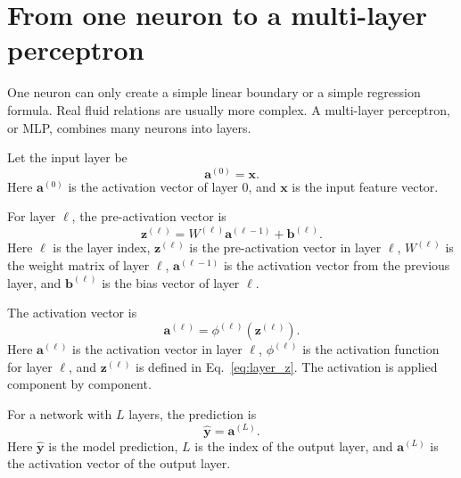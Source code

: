 \documentclass[11pt]{article}
\newcommand{\bx}{\bm{x}}
\newcommand{\by}{\bm{y}}
\begin{document}
\section{From one neuron to a multi-layer perceptron}

One neuron can only create a simple linear boundary or a simple regression formula.  Real fluid relations are usually more complex.  A multi-layer perceptron, or MLP, combines many neurons into layers.

Let the input layer be
\begin{equation}
    \bm{a}^{(0)}=\bx.
    \label{eq:input_layer}
\end{equation}
Here $\bm{a}^{(0)}$ is the activation vector of layer $0$, and $\bx$ is the input feature vector.

For layer $\ell$, the pre-activation vector is
\begin{equation}
    \bm{z}^{(\ell)} = W^{(\ell)}\bm{a}^{(\ell-1)}+\bm{b}^{(\ell)}.
    \label{eq:layer_z}
\end{equation}
Here $\ell$ is the layer index, $\bm{z}^{(\ell)}$ is the pre-activation vector in layer $\ell$, $W^{(\ell)}$ is the weight matrix of layer $\ell$, $\bm{a}^{(\ell-1)}$ is the activation vector from the previous layer, and $\bm{b}^{(\ell)}$ is the bias vector of layer $\ell$.

The activation vector is
\begin{equation}
    \bm{a}^{(\ell)} = \phi^{(\ell)}\left(\bm{z}^{(\ell)}\right).
    \label{eq:layer_a}
\end{equation}
Here $\bm{a}^{(\ell)}$ is the activation vector in layer $\ell$, $\phi^{(\ell)}$ is the activation function for layer $\ell$, and $\bm{z}^{(\ell)}$ is defined in Eq.~\eqref{eq:layer_z}.  The activation is applied component by component.

For a network with $L$ layers, the prediction is
\begin{equation}
    \widehat{\by} = \bm{a}^{(L)}.
    \label{eq:network_output}
\end{equation}
Here $\widehat{\by}$ is the model prediction, $L$ is the index of the output layer, and $\bm{a}^{(L)}$ is the activation vector of the output layer.
\end{document}
